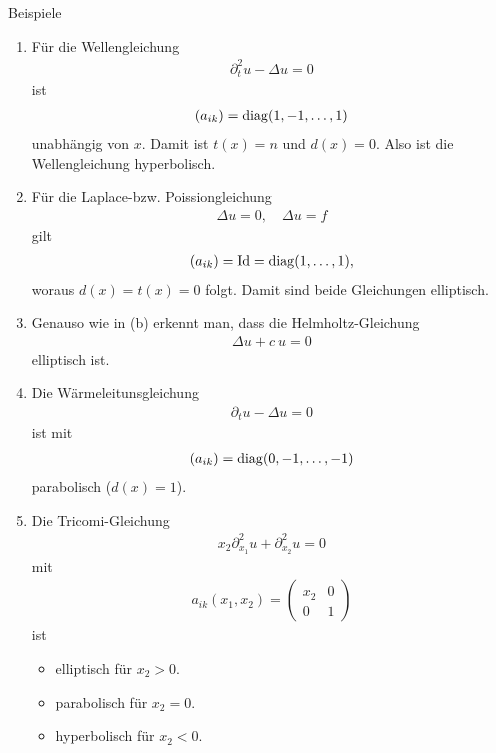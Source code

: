 \begin{genericdf}{Beispiele}
\renewcommand{\labelenumi}{(\alph{enumi})}
\begin{enumerate}
\item 
Für die Wellengleichung 
\begin{align*}
\partial^2_t u - \Delta u = 0
\end{align*}
ist
\begin{align*}
(a_{ik}) = \operatorname{diag}(1,-1, \dots, \-1)
\end{align*}
unabhängig von $x$.
Damit ist $t(x) = n$ und $d(x) = 0$.
Also ist die Wellengleichung hyperbolisch.

\item
Für die Laplace-bzw. Poissiongleichung
\begin{align*}
\Delta u = 0, \quad \Delta u = f
\end{align*}
gilt
\begin{align*}
(a_{ik}) = \operatorname{Id} = \operatorname{diag}(1, \dots, 1),
\end{align*}
woraus $d(x) = t(x) = 0$ folgt.
Damit sind beide Gleichungen elliptisch.

\item
Genauso wie in (b) erkennt man, dass die Helmholtz-Gleichung
\begin{align*}
\Delta u + c \ u = 0
\end{align*}
elliptisch ist.

\item
Die Wärmeleitunsgleichung 
\begin{align*}
\partial_t u - \Delta u  = 0 
\end{align*}
ist mit 
\begin{align*}
(a_{ik}) = \operatorname{diag}(0,-1, \dots , -1)
\end{align*}
parabolisch ($d(x) = 1$).

\item
Die Tricomi-Gleichung
\begin{align*}
x_2 \partial_{x_1}^2 u + \partial_{x_2}^2 u = 0
\end{align*}
mit 
\begin{align*}
a_{ik}(x_1,x_2) = 
\begin{pmatrix}
x_2 & 0 \\
0  & 1 
\end{pmatrix}
\end{align*}
ist 
\begin{itemize}
\item elliptisch für $x_2 > 0$.
\item parabolisch für $x_2 = 0$.
\item hyperbolisch für $x_2 < 0$.
\end{itemize}
\end{enumerate}
\end{genericdf}


